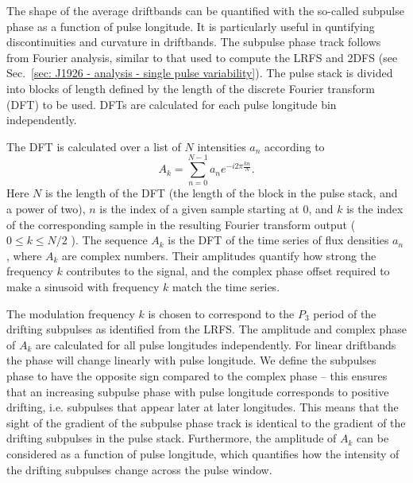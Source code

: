 The shape of the average driftbands can be quantified with the so-called subpulse phase as a function of pulse longitude. It is particularly useful in quntifying discontinuities and curvature in driftbands. The subpulse phase track follows from Fourier analysis, similar to that used to compute the LRFS and 2DFS (see Sec.~\ref{sec: J1926 - analysis - single pulse variability}). The pulse stack is divided into blocks of length defined by the length of the discrete Fourier transform (DFT) to be used. DFTs are calculated for each pulse longitude bin independently.

The DFT is calculated over a list of $N$ intensities $a_n$ according to
\begin{equation}
    A_k = \sum^{N-1}_{n=0} a_n e^{-i2\pi \frac{kn}{N}}.
\end{equation}
Here $N$ is the length of the DFT (the length of the block in the pulse stack, and a power of two), $n$ is the index of a given sample starting at $0$, and $k$ is the index of the corresponding sample in the resulting Fourier transform output ($0 \leq k \leq N/2$ ). The sequence $A_k$ is the DFT of the time series of flux densities $a_n$, where $A_k$ are complex numbers. Their amplitudes quantify how strong the frequency $k$ contributes to the signal, and the complex phase offset required to make a sinusoid with frequency $k$ match the time series. 

The modulation frequency $k$ is chosen to correspond to the $P_3$ period of the drifting subpulses as identified from the LRFS. The amplitude and complex phase of $A_k$ are calculated for all pulse longitudes independently. For linear driftbands the phase will change linearly with pulse longitude. We define the subpulses phase to have the opposite sign compared to the complex phase -- this ensures that an increasing subpulse phase with pulse longitude corresponds to positive drifting, i.e. subpulses that appear later at later longitudes. This means that the sight of the gradient of the subpulse phase track is identical to the gradient of the drifting subpulses in the pulse stack. Furthermore, the amplitude of $A_k$ can be considered as a function of pulse longitude, which quantifies how the intensity of the drifting subpulses change across the pulse window.


